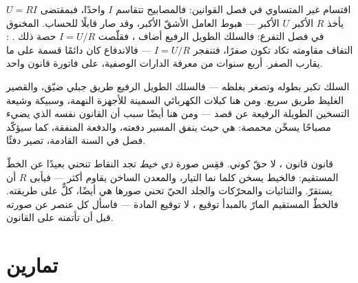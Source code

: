 \begin{example}\label{ex:g8:ohms-law:mysteries}
اقتسام  غير المتساوي في فصل القوانين: فالمصابيح  تتقاسم $I$ واحدًا، فبمقتضى $U = R I$ يأخذ $R$ الأكبر
$U$ الأكبر --- هبوط العامل الأشقّ الأكبر، وقد صار قابلًا
للحساب.  المخنوق في فصل التفرع: فالسلك الطويل الرفيع
أضاف ، فقلّصت $I = U/R$ حصة ذلك . :
التفاف مقاومته تكاد تكون صفرًا، فتنفجر $I = U/R$ --- فالاندفاع
كان دائمًا قسمة على ما يقارب الصفر. أربع سنوات من معرفة
الدارات الوصفية، على فاتورة قانون واحد.
\end{example}

\begin{example}\label{ex:g8:ohms-law:wires}
 السلك تكبر بطوله وتصغر بغلظه --- فالسلك الطويل الرفيع
طريق جبلي ضيّق، والقصير الغليظ طريق سريع. ومن هنا كبلات
الكهربائي السمينة للأجهزة النهمة، وسبيكة وشيعة التسخين
 الطويلة الرفيعة عن قصد --- ومن هنا أيضًا سبب أن
القانون نفسه الذي يضيء مصباحًا يسخّن محمصة:  هي حيث
ينفق المسير دفعته، والدفعة المنفقة، كما سيؤكّد فصل  في
السنة القادمة، تصير دفئًا.
\end{example}

\begin{remark}\label{rem:g8:ohms-law:limits}
قانون  قانون ، لا حقّ كوني. فقِس صورة \emph{ ذي
خيط} تجد النقاط تنحني بعيدًا عن الخطّ المستقيم: فالخيط يسخن
كلما نما التيار، والمعدن الساخن يقاوم أكثر --- فيأبى $R$ أن
يستقرّ. والثنائيات والمحرّكات والجلد الحيّ تحني صورها هي أيضًا،
كلٌّ على طريقته. فالخطّ المستقيم المارّ بالمبدأ توقيع ،
لا توقيع المادة --- فاسأل كل عنصر عن صورته قبل أن تأتمنه على
القانون.
\end{remark}

\section{تمارين}

